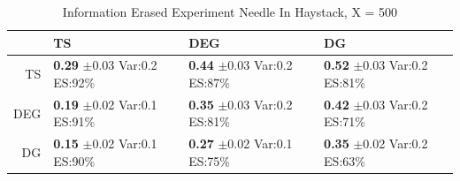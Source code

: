 \documentclass[11pt,letterpaper]{article}
\begin{document}
\begin{table}[ht]
\centering
\caption{Information Erased Experiment Needle In Haystack, X = 500} 
\begin{tabular}{rlll}
  \hline
 & TS & DEG &  DG \\ 
  \hline
TS & \makecell{\textbf{0.29} $\pm$0.03\\Var:0.2\\ES:92\%} & \makecell{\textbf{0.44} $\pm$0.03\\Var:0.2\\ES:87\%} & \makecell{\textbf{0.52} $\pm$0.03\\Var:0.2\\ES:81\%} \\ 
  DEG & \makecell{\textbf{0.19} $\pm$0.02\\Var:0.1\\ES:91\%} & \makecell{\textbf{0.35} $\pm$0.03\\Var:0.2\\ES:81\%} & \makecell{\textbf{0.42} $\pm$0.03\\Var:0.2\\ES:71\%} \\ 
   DG & \makecell{\textbf{0.15} $\pm$0.02\\Var:0.1\\ES:90\%} & \makecell{\textbf{0.27} $\pm$0.02\\Var:0.1\\ES:75\%} & \makecell{\textbf{0.35} $\pm$0.02\\Var:0.2\\ES:63\%} \\ 
   \hline
\end{tabular}
\end{table}
\end{document}
